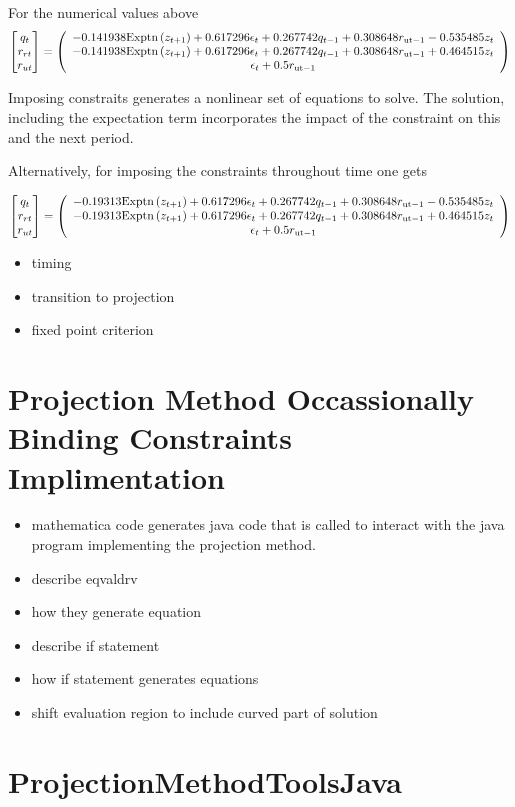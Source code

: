 \documentclass[12pt]{article}
\begin{document}
For the numerical values above
\begin{gather*}
\begin{bmatrix} q_t\\r_{rt}\\r_{ut} \end{bmatrix}=    \left(
   \begin{array}{c}
    -0.141938 \text{Exptn}\left(z_{t+1}\right)+0.617296 \epsilon _t+0.267742
      q_{t-1}+0.308648 r_{\text{ut}-1}-0.535485 z_t \\
    -0.141938 \text{Exptn}\left(z_{t+1}\right)+0.617296 \epsilon _t+0.267742
      q_{t-1}+0.308648 r_{\text{ut}-1}+0.464515 z_t \\
    \epsilon _t+0.5 r_{\text{ut}-1}
   \end{array}
   \right)
\end{gather*}

Imposing constraits generates a nonlinear set of equations to solve.
The solution, including the expectation term incorporates the impact of the
constraint on this and the next period.

Alternatively, for imposing the constraints throughout time one gets

\begin{gather*}
\begin{bmatrix} q_t\\r_{rt}\\r_{ut} \end{bmatrix}=    \left(
   \begin{array}{c}
    -0.19313 \text{Exptn}\left(z_{t+1}\right)+0.617296 \epsilon _t+0.267742
      q_{t-1}+0.308648 r_{\text{ut}-1}-0.535485 z_t \\
    -0.19313 \text{Exptn}\left(z_{t+1}\right)+0.617296 \epsilon _t+0.267742
      q_{t-1}+0.308648 r_{\text{ut}-1}+0.464515 z_t \\
    \epsilon _t+0.5 r_{\text{ut}-1}
   \end{array}
   \right)
\end{gather*}
\begin{itemize}
\item timing
\item transition to projection
\item fixed point criterion
\end{itemize}
\section{Projection Method Occassionally Binding Constraints Implimentation}
\label{sec:proj-meth-occass}
\begin{itemize}
\item mathematica code generates java code that is called to interact with the java program implementing the projection method.
\item describe eqvaldrv
\item how they generate equation
\item describe if statement
\item how if statement generates equations
\item shift evaluation region to include curved part of solution
\end{itemize}


\appendix
\section{ProjectionMethodToolsJava}
\label{sec:proj}
\end{document}
